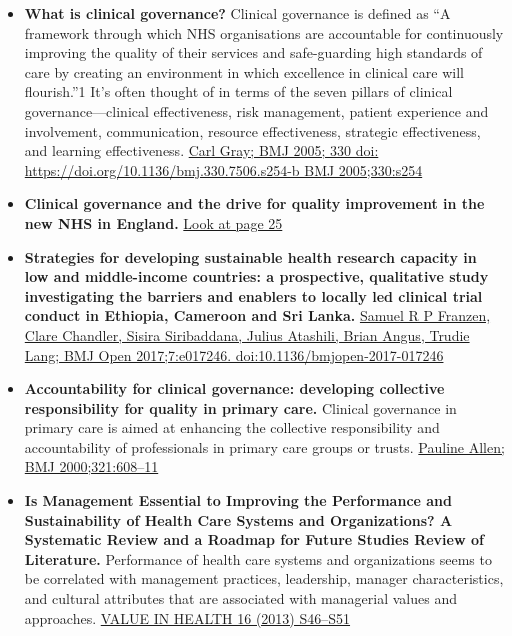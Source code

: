 \documentclass[]{book}
\begin{document}
\begin{itemize}
\item
  \textbf{What is clinical governance?} Clinical governance is defined as ``A framework through which NHS organisations are accountable for continuously improving the quality of their services and safe-guarding high standards of care by creating an environment in which excellence in clinical care will flourish.''1 It's often thought of in terms of the seven pillars of clinical governance---clinical effectiveness, risk management, patient experience and involvement, communication, resource effectiveness, strategic effectiveness, and learning effectiveness. \href{https://www.bmj.com/content/330/7506/s254.3}{Carl Gray; BMJ 2005; 330 doi: https://doi.org/10.1136/bmj.330.7506.s254-b BMJ 2005;330:s254}
\item
  \textbf{Clinical governance and the drive for quality improvement in the new NHS in England.} \href{https://www.ncbi.nlm.nih.gov/pmc/articles/PMC1113460/pdf/61.pdf}{Look at page 25}
\item
  \textbf{Strategies for developing sustainable health research capacity in low and middle-income countries: a prospective, qualitative study investigating the barriers and enablers to locally led clinical trial conduct in Ethiopia, Cameroon and Sri Lanka.} \href{https://bmjopen.bmj.com/content/bmjopen/7/10/e017246.full.pdf}{Samuel R P Franzen, Clare Chandler, Sisira Siribaddana, Julius Atashili, Brian Angus, Trudie Lang; BMJ Open 2017;7:e017246. doi:10.1136/bmjopen-2017-017246}
\item
  \textbf{Accountability for clinical governance: developing collective responsibility for quality in primary care.} Clinical governance in primary care is aimed at enhancing the collective responsibility and accountability of professionals in primary care groups or trusts. \href{https://www.who.int/management/partnerships/accountability/ClinicalGovernancePHCAccountability.pdf}{Pauline Allen; BMJ 2000;321:608--11}
\item
  \textbf{Is Management Essential to Improving the Performance and Sustainability of Health Care Systems and Organizations? A Systematic Review and a Roadmap for Future Studies Review of Literature.} Performance of health care systems and organizations seems to be correlated with management practices, leadership, manager characteristics, and cultural attributes that are associated with managerial values and approaches. \href{https://www.valueinhealthjournal.com/article/S1098-3015(12)04155-1/pdf}{VALUE IN HEALTH 16 (2013) S46--S51}
\end{itemize}
\end{document}
